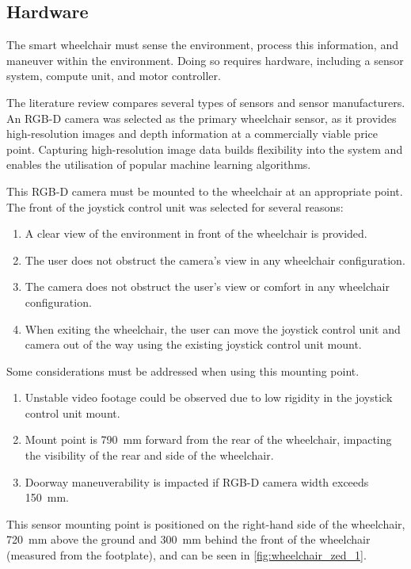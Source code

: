 \subsection{Hardware}
The smart wheelchair must sense the environment, process this information,
and maneuver within the environment. Doing so requires hardware, including a
sensor system, compute unit, and motor controller.

The literature review compares several types of sensors and sensor manufacturers.
An RGB-D camera was selected as the primary wheelchair sensor, as it provides high-resolution images and depth
information at a commercially viable price point. Capturing high-resolution image data builds flexibility into
the system and enables the utilisation of popular machine learning algorithms.

This RGB-D camera must be mounted to the wheelchair at an appropriate point. The front of the
joystick control unit was selected for several reasons:
\begin{enumerate}[topsep=0pt,itemsep=-1ex,partopsep=1ex,parsep=1ex]
    \item A clear view of the environment in front of the wheelchair is provided.
    \item The user does not obstruct the camera's view in any wheelchair configuration.
    \item The camera does not obstruct the user's view or comfort in any wheelchair configuration.
    \item When exiting the wheelchair, the user can move the joystick control unit and camera
            out of the way using the existing joystick control unit mount.
\end{enumerate}
Some considerations must be addressed when using this mounting point.
\begin{enumerate}[topsep=0pt,itemsep=-1ex,partopsep=1ex,parsep=1ex]
    \item Unstable video footage could be observed due to low rigidity in the joystick control unit mount.
    \item Mount point is \SI{790}{\milli\metre} forward from the rear of the wheelchair, impacting
            the visibility of the rear and side of the wheelchair.
    \item Doorway maneuverability is impacted if RGB-D camera width exceeds \SI{150}{\milli\metre}.
\end{enumerate}
This sensor mounting point is positioned on the right-hand side of the wheelchair,
\SI{720}{\milli\metre} above the ground and \SI{300}{\milli\metre} behind the
front of the wheelchair (measured from the footplate), and can be seen in \cref{fig:wheelchair_zed_1}.

